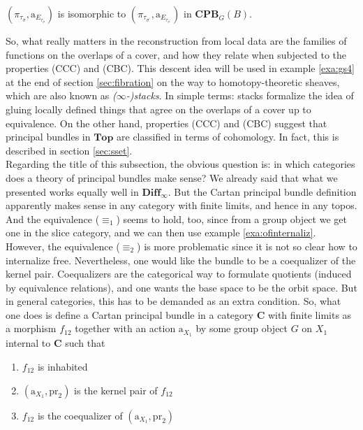 \begin{exa}[Bundles 2]
\begin{enumerate}
$(\pi_{\tau_{\sigma}},\mathrm{a}_{E_{\tau_{\sigma}}})$ is isomorphic to $(\pi_{\tau_{\sigma^{\backprime}}},\mathrm{a}_{E_{\tau_{\sigma^{\backprime}}}})$ in $\mathbf{CPB}_{G}(B)$.
\end{enumerate}
So, what really matters in the reconstruction from local data are the families of functions on the overlaps of a cover, and how they relate when subjected to the properties (CCC) and (CBC).
This {\glqq}descent{\grqq} idea will be used in example \ref{exa:gs4} at the end of section \ref{sec:fibration} on the way to {\glqq}homotopy-theoretic{\grqq} sheaves, which are also known as \textit{($\infty$-)stacks}.
In simple terms: stacks formalize the idea of gluing locally defined things that agree on the overlaps of a cover up to equivalence.
On the other hand, properties (CCC) and (CBC) suggest that principal bundles in $\mathbf{Top}$ are classified in terms of cohomology.
In fact, this is described in section \ref{sec:sset}.
\\
Regarding the title of this subsection, the obvious question is: in which categories does a theory of principal bundles make sense?
We already said that what we presented works equally well in $\mathbf{Diff}_{\infty}$.
But the Cartan principal bundle definition apparently makes sense in any category with finite limits, and hence in any topos.
And the equivalence ($\equiv_{1}$) seems to hold, too, since from a group object we get one in the slice category, and we can then use example \ref{exa:ofinternaliz}.
However, the equivalence ($\equiv_{2}$) is more problematic since it is not so clear how to internalize {\glqq}free{\grqq}.
Nevertheless, one would like the bundle to be a coequalizer of the kernel pair.
Coequalizers are the categorical way to formulate quotients (induced by equivalence relations), and one wants the base space to be the orbit space.
But in general categories, this has to be demanded as an extra condition.
So, what one does is define a Cartan principal bundle in a category $\mathbf{C}$ with finite limits as a morphism $f_{12}$ together with an action $\mathrm{a}_{X_{1}}$ by some group object $G$ on $X_{1}$ internal to $\mathbf{C}$ such that
\begin{enumerate}
\item[(ICPB1)]
$f_{12}$ is inhabited
\item[(ICPB2)]
$(\mathrm{a}_{X_{1}},\mathrm{pr}_{2})$ is the kernel pair of $f_{12}$
\item[(ICPB3)]
$f_{12}$ is the coequalizer of $(\mathrm{a}_{X_{1}},\mathrm{pr}_{2})$
\end{enumerate}

\end{exa}
